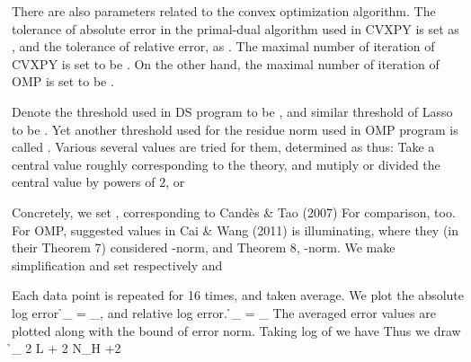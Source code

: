 There are also parameters related to the convex optimization algorithm.
The tolerance of absolute error in the primal-dual algorithm used in CVXPY is set as , and the tolerance of relative error, as .
The maximal number of iteration of CVXPY is set to be .
On the other hand, the maximal number of iteration of OMP is set to be .

Denote the threshold used in DS program to be , and similar threshold of Lasso to be .
Yet another threshold used for the residue norm used in OMP program is called \m {\eta}.
Various several values are tried for them, determined as thus: Take a central value roughly corresponding to the theory, and mutiply or divided the central value by powers of 2, or 

Concretely, we set , corresponding to Cand\`es \& Tao (2007)
For comparison,  too.
For OMP, suggested values in Cai \& Wang (2011) is illuminating, where they (in their Theorem 7) considered -norm, and Theorem 8, \m {\ell _\infty}-norm.
We make simplification and set respectively  and 

Each data point is repeated for 16 times, and taken average.
We plot the absolute log error
%
 {
\NC \h_{}
=\NC {} _{}, \NR
}
%
and relative log error.
%
 {
\NC \h_{}
=\NC {}
{ _{}} \NR
}
%
The averaged error values are plotted along with the bound of error norm.
Taking log of  we have
%
Thus we draw
 {
\NC \h_{}
\eqsim \NC {} {2} \log L + {2} \log \log N_H +2 \NR
}

\stopsubsection

\startsubsection [title={Plots for \m {N_H=32}}]

\blank [big]

\blank [big]

\blank [big]

\stopsubsection

